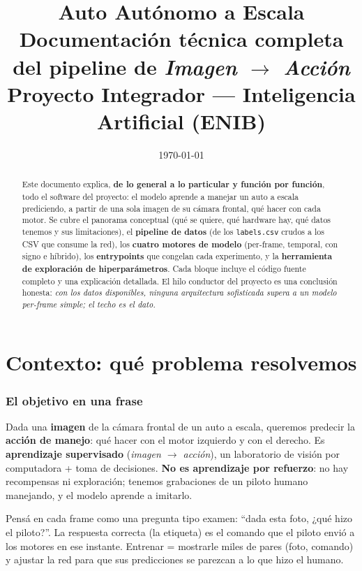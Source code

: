 \documentclass[11pt,a4paper]{article}
\title{\vspace{-1cm}\textbf{\Huge Auto Autónomo a Escala}\\[4pt]
\Large Documentación técnica completa del pipeline de \emph{Imagen $\rightarrow$ Acción}\\[10pt]
\normalsize Proyecto Integrador --- Inteligencia Artificial (ENIB)}
\author{}
\date{\today}
\begin{document}
\maketitle
\thispagestyle{empty}

\begin{abstract}
\noindent Este documento explica, \textbf{de lo general a lo particular y función por función},
todo el software del proyecto: el modelo aprende a manejar un auto a escala prediciendo, a partir
de una sola imagen de su cámara frontal, qué hacer con cada motor. Se cubre el panorama conceptual
(qué se quiere, qué hardware hay, qué datos tenemos y sus limitaciones), el \textbf{pipeline de datos}
(de los \texttt{labels.csv} crudos a los CSV que consume la red), los \textbf{cuatro motores de modelo}
(per-frame, temporal, con signo e híbrido), los \textbf{entrypoints} que congelan cada experimento, y
la \textbf{herramienta de exploración de hiperparámetros}. Cada bloque incluye el código fuente completo
y una explicación detallada. El hilo conductor del proyecto es una conclusión honesta: \emph{con los datos
disponibles, ninguna arquitectura sofisticada supera a un modelo per-frame simple; el techo es el dato.}
\end{abstract}

\tableofcontents
\newpage

\part{Contexto: qué problema resolvemos}

\section{El objetivo en una frase}
Dada una \textbf{imagen} de la cámara frontal de un auto a escala, queremos predecir la \textbf{acción de
manejo}: qué hacer con el motor izquierdo y con el derecho. Es \textbf{aprendizaje supervisado}
(\emph{imagen $\rightarrow$ acción}), un laboratorio de visión por computadora + toma de decisiones.
\textbf{No es aprendizaje por refuerzo}: no hay recompensas ni exploración; tenemos grabaciones de un
piloto humano manejando, y el modelo aprende a imitarlo.

\begin{nota}
Pensá en cada frame como una pregunta tipo examen: ``dada esta foto, ¿qué hizo el piloto?''. La respuesta
correcta (la etiqueta) es el comando que el piloto envió a los motores en ese instante. Entrenar = mostrarle
miles de pares (foto, comando) y ajustar la red para que sus predicciones se parezcan a lo que hizo el humano.
\end{nota}
\end{document}
